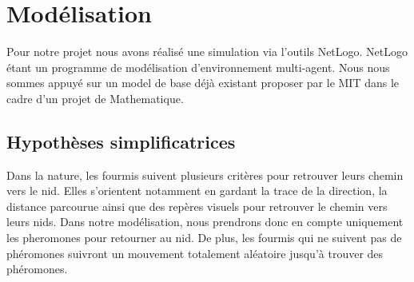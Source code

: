 \documentclass{article}
\begin{document}
\section{Modélisation}
Pour notre projet nous avons réalisé une simulation via l'outils NetLogo. NetLogo étant un programme de modélisation d'environnement multi-agent. Nous nous sommes appuyé sur un model de base déjà existant proposer par le MIT dans le cadre d'un projet de Mathematique.

\subsection{Hypothèses simplificatrices}
Dans la nature, les fourmis suivent plusieurs critères pour retrouver leurs chemin vers le nid. Elles s'orientent notamment en gardant la trace de la direction, la distance parcourue ainsi que des repères visuels pour retrouver le chemin vers leurs nids. Dans notre modélisation, nous prendrons donc en compte uniquement les pheromones pour retourner au nid. De plus, les fourmis qui ne suivent pas de phéromones suivront un mouvement totalement aléatoire jusqu'à trouver des phéromones.
\end{document}
